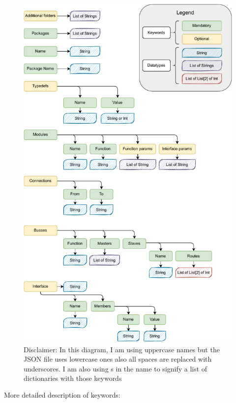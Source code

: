 \documentclass[12pt]{report}
\begin{document}
\begin{figure}[h!]
    \centering
\includegraphics[width=0.70\columnwidth]{pdfExports/LargeMapJSON.pdf}

\caption{Disclaimer: In this diagram, I am using uppercase names but the JSON file uses lowercase ones also all spaces are replaced with underscores. I am also using s in the name to signify a list of dictionaries with those keywords}

\end{figure}
\newpage
More detailed description of keywords: 
\end{document}
